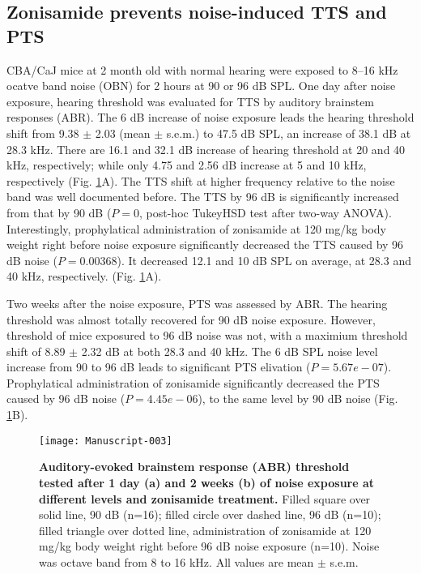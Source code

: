 \documentclass[11pt]{article}
\begin{document}
\subsection {Zonisamide prevents noise-induced TTS and PTS}




CBA/CaJ mice at 2 month old with normal hearing were exposed to 8--16 kHz ocatve band noise (OBN) for 2 hours at 90 or 96 dB SPL. One day after noise exposure, hearing threshold was evaluated for TTS by auditory brainstem responses (ABR). The 6 dB increase of noise exposure leads the hearing threshold shift from 
9.38 
$\pm$ 
2.03 
(mean $\pm$ s.e.m.) to 
47.5 dB SPL, an increase of 38.1 
dB at 28.3 kHz. There are 
16.1 
and 
32.1 
dB increase of hearing threshold at 20 and 40 kHz, respectively; while only 
4.75 
and 
2.56 
dB increase at 5 and 10 kHz, respectively (Fig. \ref{fig:Figure1}A). The TTS shift at higher frequency relative to the noise band was well documented before. The TTS by 96 dB is significantly increased from that by 90 dB 
($P = 0$, post-hoc TukeyHSD test after two-way ANOVA). 
Interestingly, prophylatical administration of zonisamide at 120 mg/kg body weight right before noise exposure significantly decreased the TTS caused by 96 dB noise 
($P = 0.00368$). It decreased 12.1 and 10 dB SPL on average, at 28.3 and 40 kHz, respectively.
(Fig. \ref{fig:Figure1}A).

Two weeks after the noise exposure, PTS was assessed by ABR. The hearing threshold was almost totally recovered for 90 dB noise exposure. However, threshold of mice exposured to 96 dB noise was not, with a maximium threshold shift of 8.89 $\pm$ 2.32 dB at both 28.3 and 40 kHz. The 6 dB SPL noise level increase from 90 to 96 dB leads to significant PTS elivation 
($P = 5.67e-07 $).
Prophylatical administration of zonisamide significantly decreased the PTS caused by 96 dB noise 
($P = 4.45e-06 $), to the same level by 90 dB noise (Fig. \ref{fig:Figure1}B).



\begin{figure}[ht!]
\centering
\texttt{[image: Manuscript-003]}

\caption{{\bf {Auditory-evoked brainstem response (ABR) threshold tested after 1 day (a) and 2 weeks (b) of noise exposure at different levels and zonisamide treatment.}} Filled square over solid line, 90 dB (n=16); filled circle over dashed line, 96 dB (n=10); filled triangle over dotted line, administration of zonisamide at 120 mg/kg body weight right before 96 dB noise exposure (n=10). Noise was octave band from 8 to 16 kHz. All values are mean $\pm$ s.e.m.}
\label{fig:Figure1}
\end{figure}
\end{document}
